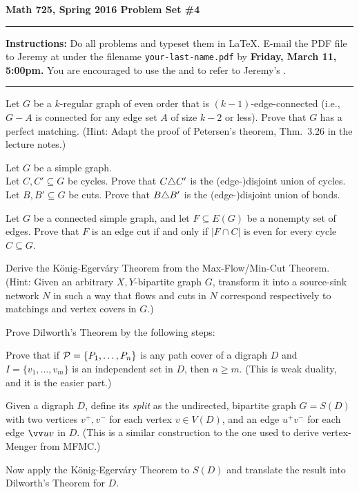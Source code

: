 

\thispagestyle{empty}
{\bf Math 725, Spring 2016 \hfill Problem Set \#4}
\smallskip\hrule

{\bf Instructions:} Do all problems and typeset them in \LaTeX.  E-mail the PDF file to Jeremy at  under the filename {\tt your-last-name.pdf} by {\bf Friday, March 11, 5:00pm.}
You are encouraged to use the  and to refer to Jeremy's .

\smallskip\hrule

\prob Let $G$ be a $k$-regular graph of even order that is $(k-1)$-edge-connected (i.e., $G-A$ is connected for any edge set $A$ of size $k-2$ or less). Prove that $G$ has a perfect matching.  (Hint: Adapt the proof of Petersen's theorem, Thm.~3.26 in the lecture notes.)

\prob Let $G$ be a simple graph.\\
\probpart Let $C,C'\subseteq G$ be cycles.  Prove that $C\triangle C'$ is the (edge-)disjoint union of cycles.\\
\probpart Let $B,B'\subseteq G$ be cuts.  Prove that $B\triangle B'$ is the (edge-)disjoint union of bonds.

\prob Let $G$ be a connected simple graph, and let $F\subseteq E(G)$ be a nonempty set of edges.  Prove that $F$ is an edge cut if and only if $|F\cap C|$ is even for every cycle $C\subseteq G$.

\prob Derive the K\"onig-Egerv\'ary Theorem from the Max-Flow/Min-Cut Theorem.  (Hint: Given an arbitrary $X,Y$-bipartite graph $G$, transform it into a source-sink network $N$ in such a way that flows and cuts in $N$ correspond respectively to matchings and vertex covers in $G$.)

\prob Prove Dilworth's Theorem by the following steps:

\probpart Prove that if $\mathcal{P}=\{P_1,\dots,P_n\}$ is any path cover of a digraph $D$ and $I=\{v_1,\dots,v_m\}$ is an independent set in $D$, then $n\geq m$.  (This is weak duality, and it is the easier part.)

\probpart Given a digraph $D$, define its \emph{split} as the undirected, bipartite graph $G=S(D)$ with two vertices $v^+,v^-$
for each vertex $v\in V(D)$, and an edge $u^+v^-$ for each edge $\dedge{uv}$ in $D$.
(This is a similar construction to the one used to derive vertex-Menger from MFMC.)


Now apply the K\"onig-Egerv\'ary Theorem to $S(D)$  and translate the result into Dilworth's Theorem for $D$.


